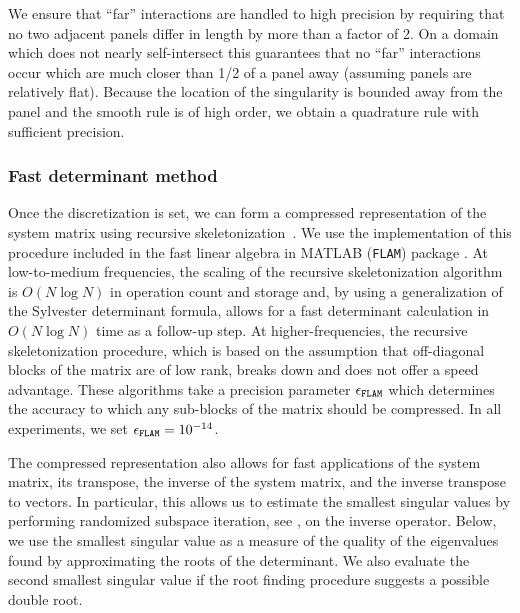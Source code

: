 \begin{remark}
  \label{rmk:levelrestrict}
  We ensure that ``far'' interactions
  are handled to high precision by requiring that
  no two adjacent panels differ in length
  by more than a factor of 2. On a domain which does
  not nearly self-intersect this
  guarantees that no ``far'' interactions occur
  which are much closer than 1/2 of a panel away
  (assuming panels are relatively flat).
  Because the location of the singularity is
  bounded away from the panel and the smooth
  rule is of high order, we obtain a quadrature
  rule with sufficient precision.
\end{remark}

\subsubsection{Fast determinant method}

Once the discretization is set, we can form
a compressed representation of the system matrix
using recursive skeletonization~\cite{ho2012fast}.
%
We use the implementation of this procedure
included in the fast linear algebra in
MATLAB (\texttt{FLAM}) package
\cite{hoFLAM_1253582}.
%
At low-to-medium frequencies, the scaling
of the recursive skeletonization algorithm
is $O(N\log N)$ in operation count and
storage and, by using a generalization
of the Sylvester determinant formula,
allows for a fast determinant
calculation in $O(N\log N)$ time as a
follow-up step.
%
At higher-frequencies,
the recursive skeletonization procedure,
which is based on the assumption that off-diagonal
blocks of the matrix are of low rank,
breaks down and does not offer a speed advantage.
%
These algorithms take a precision parameter
${\epsilon_{\texttt{FLAM}}}$ which determines the
accuracy to which any sub-blocks of the matrix
should be compressed. In all experiments,
we set ${\epsilon_{\texttt{FLAM}}} = 10^{-14}$.

The compressed representation also allows
for fast applications of the system matrix,
its transpose, the inverse of the system
matrix, and the inverse transpose to
vectors.
%
In particular, this allows us to estimate the
smallest singular values by performing
randomized subspace iteration, see
\cite[Algorithm 4.4]{halko2011finding},
on the inverse operator.
%
Below, we use the smallest singular value
as a measure of the quality of the
eigenvalues found by approximating the
roots of the determinant.
%
We also evaluate the second smallest singular
value if the root finding procedure suggests a
possible double root. 

